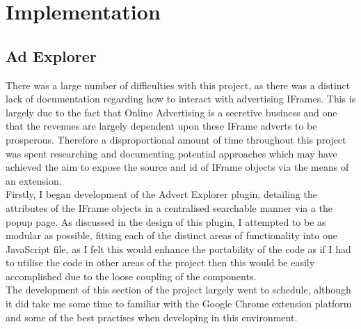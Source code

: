 \documentclass[12pt]{article}
\begin{document}
\section{Implementation}

\subsection{Ad Explorer}
There was a large number of difficulties with this project, as there was a distinct lack of documentation regarding how to interact with advertising IFrames. This is largely due to the fact that Online Advertising is a secretive business and one that the revenues are largely dependent upon these IFrame adverts to be prosperous. Therefore a disproportional amount of time throughout this project was spent researching and documenting potential approaches which may have achieved the aim to expose the source and id of IFrame objects via the means of an extension.  \\

Firstly, I began development of the Advert Explorer plugin, detailing the attributes of the IFrame objects in a centralised searchable manner via a the popup page. As discussed in the design of this plugin, I attempted to be as modular as possible, fitting each of the distinct areas of functionality into one JavaScript file, as I felt this would enhance the portability of the code as if I had to utilise the code in other areas of the project then this would be easily accomplished due to the loose coupling of the components. \\

The development of this section of the project largely went to schedule, although it did take me some time to familiar with the Google Chrome extension platform and some of the best practises when developing in this environment.  
\end{document}
